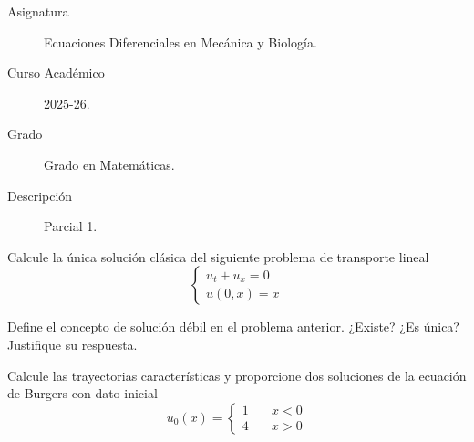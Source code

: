 \documentclass[12pt]{article}
\begin{document}

    
    

    \begin{description}
        \item[Asignatura] Ecuaciones Diferenciales en Mecánica y Biología.
        \item[Curso Académico] 2025-26.
        \item[Grado] Grado en Matemáticas.
        \item[Descripción] Parcial 1. 
    \end{description}
    \newpage



    \begin{ejercicio}
        Calcule la única solución clásica del siguiente problema de transporte lineal
        \begin{equation*}
            \begin{cases}
                u_t + u_x = 0 \\
                u(0,x) = x
            \end{cases}
        \end{equation*}
    \end{ejercicio}

    \begin{ejercicio}
        Define el concepto de solución débil en el problema anterior. ¿Existe? ¿Es única? Justifique su respuesta.
    \end{ejercicio}

    \begin{ejercicio}
        Calcule las trayectorias características y proporcione dos soluciones de la ecuación de Burgers con dato inicial
        $$u_0(x) = \begin{cases}
            1 \quad& x<0 \\
            4 \quad& x>0
        \end{cases}$$
    \end{ejercicio}
\end{document}
